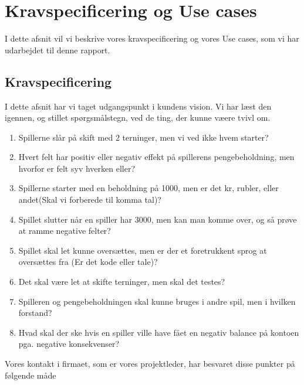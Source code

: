 \section{Kravspecificering og Use cases}
I dette afsnit vil vi beskrive vores kravspecificering og vores Use cases, som vi har udarbejdet til denne rapport.
\subsection{Kravspecificering}
I dette afsnit har vi taget udgangspunkt i kundens vision. Vi har læst den igennen, og stillet spørgsmålstegn, ved de ting, der kunne væere tvivl om.
\begin{enumerate}
\item Spillerne slår på skift med 2 terninger, men vi ved ikke hvem starter?
\item Hvert felt har positiv eller negativ effekt på spillerens pengebeholdning, men hvorfor er felt syv hverken eller?
\item Spillerne starter med en beholdning på 1000, men er det kr, rubler, eller andet(Skal vi forberede til komma tal)?
\item Spillet slutter når en spiller har 3000, men kan man komme over, og så prøve at ramme negative felter?
\item Spillet skal let kunne oversættes, men er der et foretrukkent sprog at oversættes fra (Er det kode eller tale)?
\item Det skal være let at skifte terninger, men skal det testes?
\item Spilleren og pengebeholdningen skal kunne bruges i andre spil, men i hvilken forstand?
\item Hvad skal der ske hvis en spiller ville have fået en negativ balance på kontoen pga. negative konsekvenser?
\end{enumerate}
Vores kontakt i firmaet, som er vores projektleder, har besvaret disse punkter på følgende måde
